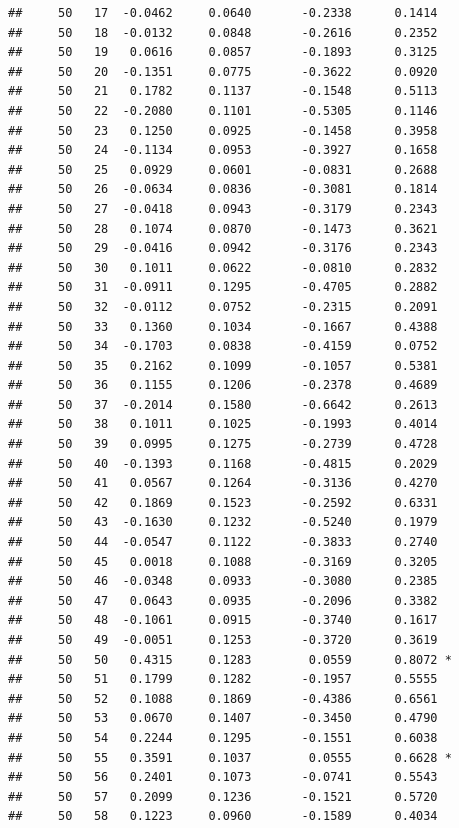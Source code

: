 \documentclass[
]{article}
\begin{document}
\begin{verbatim}
##     50   17  -0.0462     0.0640       -0.2338      0.1414  
##     50   18  -0.0132     0.0848       -0.2616      0.2352  
##     50   19   0.0616     0.0857       -0.1893      0.3125  
##     50   20  -0.1351     0.0775       -0.3622      0.0920  
##     50   21   0.1782     0.1137       -0.1548      0.5113  
##     50   22  -0.2080     0.1101       -0.5305      0.1146  
##     50   23   0.1250     0.0925       -0.1458      0.3958  
##     50   24  -0.1134     0.0953       -0.3927      0.1658  
##     50   25   0.0929     0.0601       -0.0831      0.2688  
##     50   26  -0.0634     0.0836       -0.3081      0.1814  
##     50   27  -0.0418     0.0943       -0.3179      0.2343  
##     50   28   0.1074     0.0870       -0.1473      0.3621  
##     50   29  -0.0416     0.0942       -0.3176      0.2343  
##     50   30   0.1011     0.0622       -0.0810      0.2832  
##     50   31  -0.0911     0.1295       -0.4705      0.2882  
##     50   32  -0.0112     0.0752       -0.2315      0.2091  
##     50   33   0.1360     0.1034       -0.1667      0.4388  
##     50   34  -0.1703     0.0838       -0.4159      0.0752  
##     50   35   0.2162     0.1099       -0.1057      0.5381  
##     50   36   0.1155     0.1206       -0.2378      0.4689  
##     50   37  -0.2014     0.1580       -0.6642      0.2613  
##     50   38   0.1011     0.1025       -0.1993      0.4014  
##     50   39   0.0995     0.1275       -0.2739      0.4728  
##     50   40  -0.1393     0.1168       -0.4815      0.2029  
##     50   41   0.0567     0.1264       -0.3136      0.4270  
##     50   42   0.1869     0.1523       -0.2592      0.6331  
##     50   43  -0.1630     0.1232       -0.5240      0.1979  
##     50   44  -0.0547     0.1122       -0.3833      0.2740  
##     50   45   0.0018     0.1088       -0.3169      0.3205  
##     50   46  -0.0348     0.0933       -0.3080      0.2385  
##     50   47   0.0643     0.0935       -0.2096      0.3382  
##     50   48  -0.1061     0.0915       -0.3740      0.1617  
##     50   49  -0.0051     0.1253       -0.3720      0.3619  
##     50   50   0.4315     0.1283        0.0559      0.8072 *
##     50   51   0.1799     0.1282       -0.1957      0.5555  
##     50   52   0.1088     0.1869       -0.4386      0.6561  
##     50   53   0.0670     0.1407       -0.3450      0.4790  
##     50   54   0.2244     0.1295       -0.1551      0.6038  
##     50   55   0.3591     0.1037        0.0555      0.6628 *
##     50   56   0.2401     0.1073       -0.0741      0.5543  
##     50   57   0.2099     0.1236       -0.1521      0.5720  
##     50   58   0.1223     0.0960       -0.1589      0.4034  

\end{verbatim}
\end{document}
